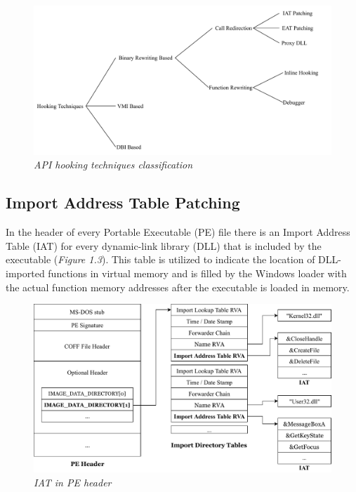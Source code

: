 \begin{figure}[h]
\centering
\hspace*{-3em}
\includegraphics[scale=0.8]{Figures/API-hooking-3.pdf}
\caption{\textit{API hooking techniques classification}}
\end{figure}

\subsection{Import Address Table Patching}

In the header of every Portable Executable (PE) file there is an Import Address Table (IAT) for every dynamic-link library (DLL) that is included by the executable \cite{Berdajs:2010:EAU:1815744.1815746} (\textit{Figure 1.3}). This table is utilized to indicate the location of DLL-imported functions in virtual memory and is filled by the Windows loader with the actual function memory addresses after the executable is loaded in memory.

\begin{figure}[h]
\centering
\hspace*{-3em}
\includegraphics[scale=0.8]{Figures/IAT-3.pdf}
\caption{\textit{IAT in PE header}}
\end{figure}

